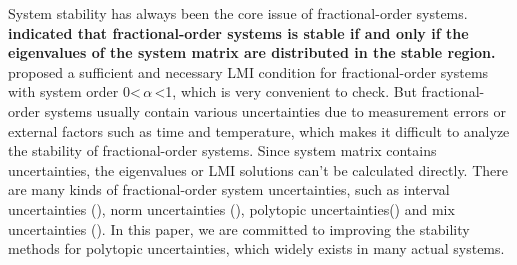 \documentclass[]{interact}
\theoremstyle{plain}%
\theoremstyle{definition}
\theoremstyle{remark}
\begin{document}
\par System stability has always been the core issue of fractional-order systems. \textbf{\cite{Mat1996} indicated that fractional-order systems is stable if and only if the eigenvalues of the system matrix are distributed in the stable region.} \cite{Far2010} proposed a sufficient and necessary LMI condition for fractional-order systems with system order 0\textless\,$\alpha$\,\textless1, which is very convenient to check. But fractional-order systems usually contain various uncertainties due to measurement errors or external factors such as time and temperature, which makes it difficult to analyze the stability of fractional-order systems. Since system matrix contains uncertainties, the eigenvalues or LMI solutions can't be calculated directly. There are many kinds of fractional-order system uncertainties, such as interval uncertainties (\citealp{Moh2019}), norm uncertainties (\citealp{Lu2017}), polytopic uncertainties(\citealp{Dinh2020, Li2020}) and mix uncertainties (\citealp{Matusu2017}). In this paper, we are committed to improving the stability methods for polytopic uncertainties, which widely exists in many actual systems.
\end{document}
